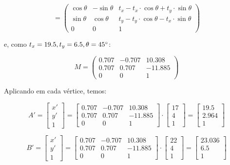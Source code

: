 \documentclass{article}
\begin{document}
$$= \begin{pmatrix}
	\cos\theta & -\sin\theta & t_x - t_x \cdot \cos\theta + t_y \cdot \sin\theta\\
	\sin\theta & \cos\theta & t_y - t_y \cdot \cos\theta - t_x \cdot \sin\theta\\
	0 & 0 & 1
\end{pmatrix}$$

\noindent e, como $t_x = 19.5, t_y = 6.5, \theta = 45\degree$:

$$M = \begin{pmatrix}
	0.707 & -0.707 & 10.308\\
	0.707 & 0.707 & -11.885\\
	0 & 0 & 1
\end{pmatrix}$$

Aplicando em cada vértice, temos:

$$A' = \begin{bmatrix}
	x'\\
	y'\\
	1
\end{bmatrix} = \begin{bmatrix}
0.707 & -0.707 & 10.308\\
0.707 & 0.707 & -11.885\\
0 & 0 & 1
\end{bmatrix} \cdot \begin{bmatrix}
17\\
4\\
1
\end{bmatrix} = \begin{bmatrix}
19.5\\
2.964\\
1
\end{bmatrix}$$

$$B' = \begin{bmatrix}
	x'\\
	y'\\
	1
\end{bmatrix} = \begin{bmatrix}
	0.707 & -0.707 & 10.308\\
	0.707 & 0.707 & -11.885\\
	0 & 0 & 1
\end{bmatrix} \cdot \begin{bmatrix}
	22\\
	4\\
	1
\end{bmatrix} = \begin{bmatrix}
	23.036\\
	6.5\\
	1
\end{bmatrix}$$
\end{document}

